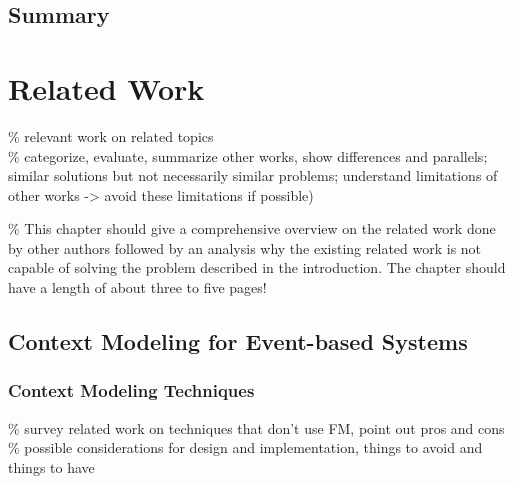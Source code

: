 \section{Summary}


\chapter{Related Work}
\% relevant work on related topics \\
\% categorize, evaluate, summarize other works, show differences and parallels; similar solutions but not necessarily similar problems; understand limitations of other works -> avoid these limitations if possible)

\% This chapter should give a comprehensive overview on the related work done by other authors followed by an analysis why the existing related work is not capable of solving the problem described in the introduction. The chapter should have a length of about three to five pages!

\section{Context Modeling for Event-based Systems}

\subsection{Context Modeling Techniques}
\% survey related work on techniques that don't use FM, point out pros and cons \\
\% possible considerations for design and implementation, things to avoid and things to have \\ \\

